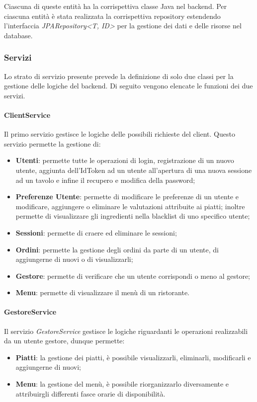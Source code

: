 Ciascuna di queste entità ha la corrispettiva classe Java nel backend. Per ciascuna entità è stata realizzata la corrispettiva repository estendendo l'interfaccia \textit{JPARepository<T, ID>} per la gestione dei dati e delle risorse nel database.
\subsubsection*{Servizi}
Lo strato di servizio presente prevede la definizione di solo due classi per la gestione delle logiche del backend. Di seguito vengono elencate le funzioni dei due servizi.
\paragraph{ClientService}
Il primo servizio gestisce le logiche delle possibili richieste del client. Questo servizio permette la gestione di:
\begin{itemize}
  \item \textbf{Utenti}: permette tutte le operazioni di login, registrazione di un nuovo utente, aggiunta dell'IdToken ad un utente all'apertura di una nuova sessione ad un tavolo e infine il recupero e modifica della password;
  \item \textbf{Preferenze Utente}: permette di modificare le preferenze di un utente e modificare, aggiungere o eliminare le valutazioni attribuite ai piatti; inoltre permette di visualizzare gli ingredienti nella blacklist di uno specifico utente;
  \item \textbf{Sessioni}: permette di craere ed eliminare le sessioni;
  \item \textbf{Ordini}: permette la gestione degli ordini da parte di un utente, di aggiungerne di nuovi o di visualizzarli;
  \item \textbf{Gestore}: permette di verificare che un utente corrispondi o meno al gestore;
  \item \textbf{Menu}: permette di visualizzare il menù di un ristorante.
\end{itemize}
\paragraph{GestoreService}
Il servizio \textit{GestoreService} gestisce le logiche riguardanti le operazioni realizzabili da un utente gestore, dunque permette:
\begin{itemize}
  \item \textbf{Piatti}: la gestione dei piatti, è possibile visualizzarli, eliminarli, modificarli e aggiungerne di nuovi;
  \item \textbf{Menu}: la gestione del menù, è possibile riorganizzarlo diversamente e attribuirgli differenti fasce orarie di disponibilità.
\end{itemize}
